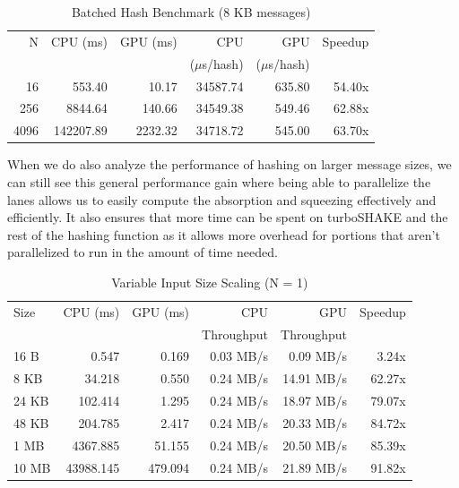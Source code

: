 \documentclass[conference]{IEEEtran}
\begin{document}
\begin{table}[h]
\centering
\footnotesize
\caption{Batched Hash Benchmark (8 KB messages)}
\begin{tabular}{|r|r|r|r|r|r|}
 \hline
 N & CPU (ms) & GPU (ms) & CPU & GPU  & Speedup \\
  &  &  & ($\mu$s/hash) & ($\mu$s/hash) &  \\
 \hline
  16           & 553.40        & 10.17          & 34587.74     & 635.80       & 54.40x \\
  256          & 8844.64       & 140.66         & 34549.38     & 549.46       & 62.88x\\ 
  4096         & 142207.89     & 2232.32        & 34718.72     & 545.00       & 63.70x\\
 \hline
\end{tabular}
\label{tab:exp1}
\end{table}

When we do also analyze the performance of hashing on larger message sizes, we can still see this general performance gain where being able to parallelize the lanes allows us to easily compute the absorption and squeezing effectively and efficiently. It also ensures that more time can be spent on turboSHAKE and the rest of the hashing function as it allows more overhead for portions that aren't parallelized to run in the amount of time needed.

\begin{table}[h]
\centering
\footnotesize
\caption{Variable Input Size Scaling (N = 1)}
\begin{tabular}{|l|r|r|r|r|r|}
 \hline
 Size & CPU (ms) & GPU (ms) & CPU & GPU & Speedup \\
 & &  & Throughput & Throughput & \\
 \hline
  16 B         & 0.547         & 0.169         & 0.03 MB/s     & 0.09 MB/s       & 3.24x\\
  8 KB         & 34.218        & 0.550         & 0.24 MB/s     & 14.91 MB/s       & 62.27x\\
  24 KB        & 102.414       & 1.295         & 0.24 MB/s     & 18.97 MB/s       & 79.07x\\
  48 KB        & 204.785       & 2.417         & 0.24 MB/s     & 20.33 MB/s       & 84.72x\\
  1 MB         & 4367.885      & 51.155        & 0.24 MB/s     & 20.50 MB/s       & 85.39x\\
  10 MB        & 43988.145     & 479.094       & 0.24 MB/s     & 21.89 MB/s       & 91.82x\\
 \hline
\end{tabular}
\label{tab:exp2}
\end{table}
\end{document}
